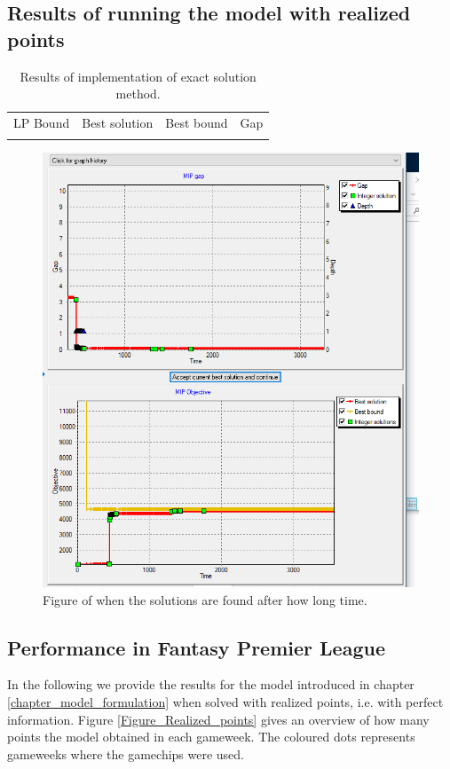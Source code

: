 \subsection{Results of running the model with realized points}


\begin{table}[H]
    \centering
    \caption{Results of implementation of exact solution method.}
    \begin{tabular}{c|c|c|c}
        LP Bound & Best solution & Best bound & Gap  \\
         & & & 
    \end{tabular}
\end{table}

\begin{figure}[H]

    \centering
    \includegraphics[scale=0.65]{fig/chapter_7/opt_solution_graph.png}
    \caption{Figure of when the solutions are found after how long time.}
    \label{fig:opt_solution_graph}
\end{figure}

\subsection{Performance in Fantasy Premier League}
In the following we provide the results for the model introduced in chapter \ref{chapter_model_formulation} when solved with realized points, i.e. with perfect information. Figure \ref{Figure_Realized_points} gives an overview of how many points the model obtained in each gameweek. The coloured dots represents gameweeks where the gamechips were used. 

